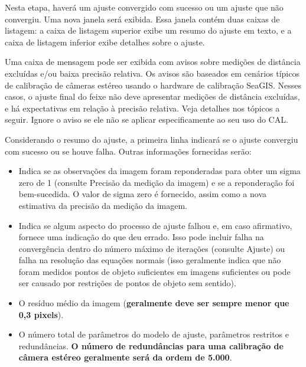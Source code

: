 \documentclass[
  12pt,
  letterpaper,
  DIV=11,
  numbers=noendperiod]{scrreprt}
\providecommand{\tightlist}{%
  \setlength{\itemsep}{0pt}\setlength{\parskip}{0pt}}
\begin{document}
Nesta etapa, haverá um ajuste convergido com sucesso ou um ajuste que
não convergiu. Uma nova janela será exibida. Essa janela contém duas
caixas de listagem: a caixa de listagem superior exibe um resumo do
ajuste em texto, e a caixa de listagem inferior exibe detalhes sobre o
ajuste.

Uma caixa de mensagem pode ser exibida com avisos sobre medições de
distância excluídas e/ou baixa precisão relativa. Os avisos são baseados
em cenários típicos de calibração de câmeras estéreo usando o hardware
de calibração SeaGIS. Nesses casos, o ajuste final do feixe não deve
apresentar medições de distância excluídas, e há expectativas em relação
à precisão relativa. Veja detalhes nos tópicos a seguir. Ignore o aviso
se ele não se aplicar especificamente ao seu uso do CAL.

Considerando o resumo do ajuste, a primeira linha indicará se o ajuste
convergiu com sucesso ou se houve falha. Outras informações fornecidas
serão:

\begin{itemize}
\tightlist
\item
  Indica se as observações da imagem foram reponderadas para obter um
  sigma zero de 1 (consulte Precisão da medição da imagem) e se a
  reponderação foi bem-sucedida. O valor de sigma zero é fornecido,
  assim como a nova estimativa da precisão da medição da imagem.
\end{itemize}

\begin{itemize}
\tightlist
\item
  Indica se algum aspecto do processo de ajuste falhou e, em caso
  afirmativo, fornece uma indicação do que deu errado. Isso pode incluir
  falha na convergência dentro do número máximo de iterações (consulte
  Ajuste) ou falha na resolução das equações normais (isso geralmente
  indica que não foram medidos pontos de objeto suficientes em imagens
  suficientes ou pode ser causado por restrições de pontos de objeto sem
  sentido).
\end{itemize}

\begin{itemize}
\tightlist
\item
  O resíduo médio da imagem (\textbf{geralmente deve ser sempre menor
  que 0,3 pixels}).
\end{itemize}

\begin{itemize}
\tightlist
\item
  O número total de parâmetros do modelo de ajuste, parâmetros restritos
  e redundâncias. \textbf{O número de redundâncias para uma calibração
  de câmera estéreo geralmente será da ordem de 5.000}.
\end{itemize}
\end{document}
